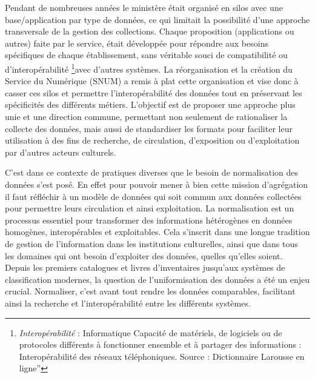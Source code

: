 Pendant de nombreuses années le ministère était organisé en silos avec une base/application par type de données, ce qui limitait la possibilité d'une approche transversale de la gestion des collections. Chaque proposition (applications ou autres) faite par le service, était développée pour répondre aux besoins spécifiques de chaque établissement, sans véritable souci de compatibilité ou d'interopérabilité \footnote{\emph{Interopérabilité }: Informatique
Capacité de matériels, de logiciels ou de protocoles différents à fonctionner ensemble et à partager des informations : Interopérabilité des réseaux téléphoniques. Source : Dictionnaire Larousse en ligne”}avec d'autres systèmes. La réorganisation et la création du Service du Numérique (SNUM) a remis à plat cette organisation et vise donc à casser ces silos et permettre l’interopérabilité des données tout en préservant les spécificités des différents métiers. L'objectif est de proposer une approche plus unie et une direction commune, permettant non seulement de rationaliser la collecte des données, mais aussi de standardiser les formats pour faciliter leur utilisation à des fins de recherche, de circulation, d'exposition ou d'exploitation par d'autres acteurs culturels.\newline 

C’est dans ce contexte de pratiques diverses que le besoin de normalisation des données s’est posé. En effet pour pouvoir mener à bien cette mission d'agrégation il faut réfléchir à un modèle de données qui soit commun aux données collectées pour permettre leurs circulation et ainsi exploitation. 
La normalisation est un processus essentiel pour transformer des informations hétérogènes en données homogènes, interopérables et exploitables. Cela s'inscrit dans une longue tradition de gestion de l'information dans les institutions culturelles, ainsi que dans tous les domaines qui ont besoin d’exploiter des données, quelles qu’elles soient. 
Depuis les premiers catalogues et livres d'inventaires jusqu'aux systèmes de classification modernes, la question de l'uniformisation des données a été un enjeu crucial. Normaliser, c'est avant tout rendre les données comparables, facilitant ainsi la recherche et l'interopérabilité entre les différents systèmes. \newline


